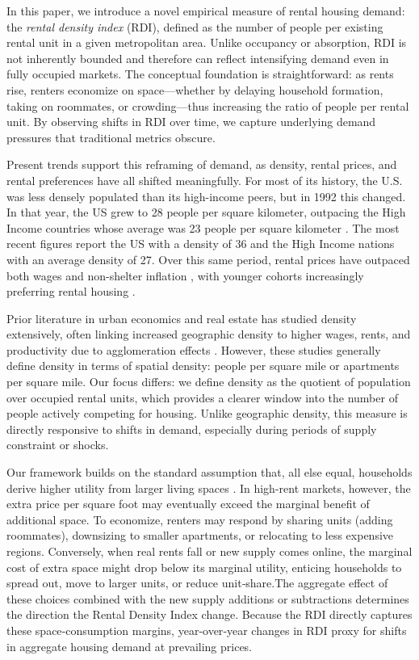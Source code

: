 \documentclass[APA,Times1COL]{WileyNJDv5} %
\begin{document}
In this paper, we introduce a novel empirical measure of rental housing demand: the \textit{rental density index} (RDI), defined as the number of people per existing rental unit in a given metropolitan area. Unlike occupancy or absorption, RDI is not inherently bounded and therefore can reflect intensifying demand even in fully occupied markets. The conceptual foundation is straightforward: as rents rise, renters economize on space---whether by delaying household formation, taking on roommates, or crowding---thus increasing the ratio of people per rental unit. By observing shifts in RDI over time, we capture underlying demand pressures that traditional metrics obscure.

Present trends support this reframing of demand, as density, rental prices, and rental preferences have all shifted meaningfully. For most of its history, the U.S. was less densely populated than its high-income peers, but in 1992 this changed. In that year, the US grew to 28 people per square kilometer, outpacing the High Income countries whose average was 23 people per square kilometer \cite{worldbankPopDensity}. The most recent figures report the US with a density of 36 and the High Income nations with an average density of 27.  Over this same period, rental prices have outpaced both wages and non-shelter inflation \cite{feiveson2024rent, stlouisfedConsumerPrice}, with younger cohorts increasingly preferring rental housing \cite{fanniemaeConsumersFeeling}.

Prior literature in urban economics and real estate has studied density extensively, often linking increased geographic density to higher wages, rents, and productivity due to agglomeration effects \cite{titman2024city, liu2018vertical}. However, these studies generally define density in terms of spatial density: people per square mile or  apartments per square mile. Our focus differs: we define density as the quotient of population over occupied rental units, which provides a clearer window into the number of people actively competing for housing. Unlike geographic density, this measure is directly responsive to shifts in demand, especially during periods of supply constraint or shocks. 

Our framework builds on the standard assumption that, all else equal, households derive higher utility from larger living spaces \cite{muth1969cities,molloy2022housing}. In high-rent markets, however, the extra price per square foot may eventually exceed the marginal benefit of additional space. To economize, renters may respond by sharing units (adding roommates), downsizing to smaller apartments, or relocating to less expensive regions. Conversely, when real rents fall or new supply comes online, the marginal cost of extra space might drop below its marginal utility, enticing households to spread out, move to larger units, or reduce unit‐share.The aggregate effect of these choices combined with the new supply additions or subtractions determines the direction the Rental Density Index change. Because the RDI directly captures these space‐consumption margins, year‐over‐year changes in RDI proxy for shifts in aggregate housing demand at prevailing prices.
\end{document}
